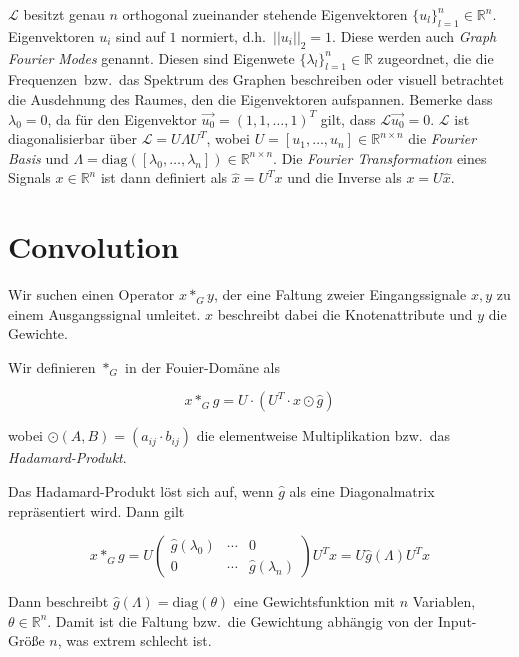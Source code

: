 $\mathcal{L}$ besitzt genau $n$ orthogonal zueinander stehende Eigenvektoren $\lbrace u_l \rbrace_{l=1}^n \in \mathbb{R}^n$.
Eigenvektoren $u_i$ sind auf $1$ normiert, d.h.\ $||u_i||_2 = 1$.
Diese werden auch \emph{Graph Fourier Modes} genannt.
Diesen sind Eigenwete $\lbrace \lambda_l \rbrace_{l=1}^n \in \mathbb{R}$ zugeordnet, die die \glqq{}Frequenzen\grqq\ bzw.\ das Spektrum des Graphen beschreiben oder visuell betrachtet die Ausdehnung des Raumes, den die Eigenvektoren aufspannen.
Bemerke dass $\lambda_0 = 0$, da für den Eigenvektor $\vec{u_0} = {(1, 1, \ldots, 1)}^T$ gilt, dass $\mathcal{L}\vec{u_0} = 0$.
$\mathcal{L}$ ist diagonalisierbar über $\mathcal{L} = U \Lambda U^T$, wobei $U = [u_1, \ldots, u_n] \in \mathbb{R}^{n \times n}$ die \emph{Fourier Basis} und $\Lambda = \text{diag}([\lambda_0, \ldots, \lambda_n]) \in \mathbb{R}^{n \times n}$.
Die \emph{Fourier Transformation} eines Signals $x \in \mathbb{R}^n$ ist dann definiert als $\hat{x} = U^{T}x$ und die Inverse als $x = U\hat{x}$.

\section{Convolution}

Wir suchen einen Operator $x *_G y$, der eine Faltung zweier Eingangssignale $x, y$ zu einem Ausgangssignal umleitet.
$x$ beschreibt dabei die Knotenattribute und $y$ die Gewichte.

Wir definieren $*_G$ in der Fouier-Domäne als

\begin{equation}
  x *_G g = U \cdot (U^T \cdot x \odot \hat g)
\end{equation}

wobei $\odot(A, B) = (a_{ij} \cdot b_{ij})$ die elementweise Multiplikation bzw.\ das \emph{Hadamard-Produkt}.

Das Hadamard-Produkt löst sich auf, wenn $\hat g$ als eine Diagonalmatrix repräsentiert wird. Dann gilt

\begin{equation}
  x *_G g = U \begin{pmatrix}
    \hat g(\lambda_0) & \cdots & 0\\
    0 & \cdots & \hat g(\lambda_n)
  \end{pmatrix}U^T x = U \hat g(\Lambda) U^T x
\end{equation}

Dann beschreibt $\hat g(\Lambda) = \text{diag}(\theta)$ eine Gewichtsfunktion mit $n$ Variablen, $\theta \in \mathbb{R}^n$.
Damit ist die Faltung bzw.\ die Gewichtung abhängig von der Input-Größe $n$, was extrem schlecht ist.

